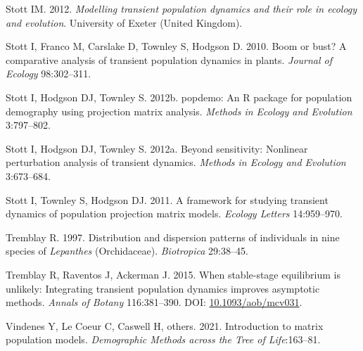 \documentclass[
  12pt,
  letterpaper,
]{book}
\newlength{\cslhangindent}
\newenvironment{CSLReferences}[2] %
 {\begin{list}{}{%
  \setlength{\itemindent}{0pt}
  \setlength{\leftmargin}{0pt}
  \setlength{\parsep}{0pt}
  \ifodd #1
   \setlength{\leftmargin}{\cslhangindent}
   \setlength{\itemindent}{-1\cslhangindent}
  \fi
  \setlength{\itemsep}{#2\baselineskip}}}
 {\end{list}}
\begin{document}
\begin{CSLReferences}{1}{0}
Stott IM. 2012. \emph{Modelling transient population dynamics and their
role in ecology and evolution}. University of Exeter (United Kingdom).

Stott I, Franco M, Carslake D, Townley S, Hodgson D. 2010. Boom or bust?
A comparative analysis of transient population dynamics in plants.
\emph{Journal of Ecology} 98:302--311.

Stott I, Hodgson DJ, Townley S. 2012b. {p}opdemo: An {R} package for
population demography using projection matrix analysis. \emph{Methods in
Ecology and Evolution} 3:797--802.

Stott I, Hodgson DJ, Townley S. 2012a. Beyond sensitivity: Nonlinear
perturbation analysis of transient dynamics. \emph{Methods in Ecology
and Evolution} 3:673--684.

Stott I, Townley S, Hodgson DJ. 2011. A framework for studying transient
dynamics of population projection matrix models. \emph{Ecology Letters}
14:959--970.

Tremblay R. 1997. Distribution and dispersion patterns of individuals in
nine species of \emph{{L}epanthes} ({O}rchidaceae). \emph{Biotropica}
29:38--45.

Tremblay R, Raventos J, Ackerman J. 2015. When stable-stage equilibrium
is unlikely: Integrating transient population dynamics improves
asymptotic methods. \emph{Annals of Botany} 116:381--390. DOI:
\href{https://doi.org/10.1093/aob/mcv031}{10.1093/aob/mcv031}.

Vindenes Y, Le Coeur C, Caswell H, others. 2021. Introduction to matrix
population models. \emph{Demographic Methods across the Tree of
Life}:163--81.

\end{CSLReferences}


\backmatter
\end{document}
